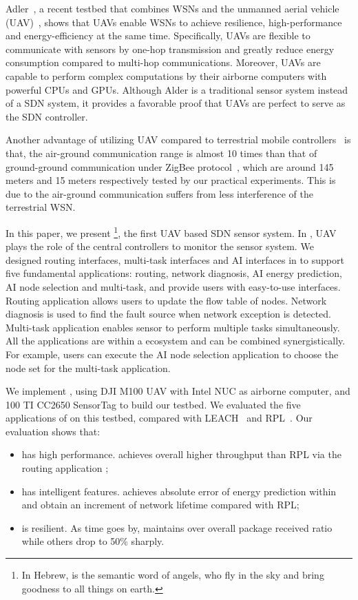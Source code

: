 Adler~\cite{Alder}, a recent testbed that combines WSNs
and the unmanned aerial vehicle (UAV)~\cite{Cambone2005Unmanned, Perry2000Unmanned, Cathcart2014Method},
shows that UAVs enable WSNs to achieve resilience, 
high-performance and energy-efficiency at the same time.
Specifically, UAVs are flexible to 
communicate with sensors by one-hop transmission
and greatly reduce energy consumption compared to multi-hop communications.
Moreover, UAVs are capable to perform complex computations 
by their airborne computers with powerful CPUs and GPUs.
Although Alder is a traditional sensor system instead of a SDN system, 
it provides a favorable proof
that UAVs are perfect to serve as the SDN controller.

Another advantage of utilizing UAV compared to
terrestrial mobile controllers~\cite{Somasundara2007Mobile} is that, the air-ground communication range
is almost 10 times than that of ground-ground communication under ZigBee protocol~\cite{Farahani2008ZigBee}, which are
around 145 meters and 15 meters respectively tested by our practical experiments.
This is due to the air-ground communication suffers from less interference of the terrestrial WSN.

In this paper, we present {\sdn}\footnote{In Hebrew, {\sdn} is the semantic word of angels, who fly in the sky and bring goodness to all things on earth. }, 
the first UAV based SDN sensor system.
In {\sdn}, UAV plays the role of the central controllers to monitor the sensor system.
We designed routing interfaces, multi-task interfaces and AI interfaces in {\sdn} to support
five fundamental applications: routing, network diagnosis, 
AI energy prediction, AI node selection and multi-task,
and provide users with easy-to-use interfaces.
Routing application allows users to update the flow table of nodes.
Network diagnosis is used to find the fault source when network exception is detected.
Multi-task application enables sensor to perform multiple 
tasks simultaneously. All the applications are within a ecosystem
and can be combined synergistically. For example,
users can execute the AI node selection application to choose
the node set for the multi-task application. 


We implement {\sdn}, using DJI M100 UAV with Intel NUC as airborne computer, 
and 100 TI CC2650 SensorTag to build our testbed.
We evaluated the five applications of  {\sdn} on this testbed, 
compared with LEACH~\cite{kaur2016wsn} and RPL~\cite{winter2012rpl}.
Our evaluation shows that:
\begin{itemize}
	\item[1)] {\sdn} has high performance. {\sdn} achieves overall {\simpleTput} higher
		throughput than RPL via the routing application ;
	\item[2)] {\sdn} has intelligent features. {\sdn} achieves  absolute error of energy prediction within {\Error} 
		and obtain an {\totalLife} increment of network lifetime compared with RPL;
	\item[3)] {\sdn} is resilient. As time goes by, {\sdn} maintains over
		{\pktRecvRatio} overall package received ratio while others drop to 50\%
		sharply.
\end{itemize}

